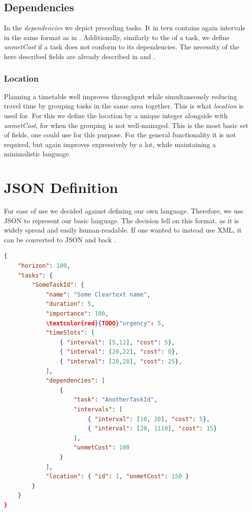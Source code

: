 \subsection*{Dependencies}
In the \textit{dependencies} we depict preceding tasks. It in tern contains again intervals in the same format as in . Additionally, similarly to the  of a task, we define \textit{unmetCost} if a task does not conform to its dependencies. The necessity of the here described fields are already described in  and .

\subsubsection*{Location}
Planning a timetable well improves throughput while simultaneously reducing travel time by grouping tasks in the same area together. This is what \textit{location} is used for. For this we define the location by a unique integer alongside with \textit{unmetCost}, for when the grouping is not well-managed. This is the most basic set of fields, one could use for this purpose. For the general functionality it is not required, but again improves expressively by a lot, while maintaining a minimalistic language.

\section{JSON Definition}
For ease of use we decided against defining our own language. Therefore, we use \ac{JSON} to represent our basic language. The decision fell on this format, as it is widely spread and easily human-readable. If one wanted to instead use XML, it can be converted to JSON and back \cite{bib:2017-LaFontaine}.
\begin{lstlisting}[language=json]
{
    "horizon": 100,
    "tasks": {
        "SomeTaskId": {
            "name": "Some Cleartext name",
            "duration": 5,
            "importance": 100,
            \textcolor{red}{TODO}"urgency": 5,
            "timeSlots": [
                { "interval": [5,12], "cost": 5},
                { "interval": [20,22], "cost": 0},
                { "interval": [20,28], "cost": 25},
            ],
            "dependencies": [
                { 
                    "task": "AnotherTaskId",
                    "intervals": [
                        { "interval": [10, 20], "cost": 5},
                        { "interval": [20, 1110], "cost": 15}
                    ],
                    "unmetCost": 100
                }
            ],
            "location": { "id": 1, "unmetCost": 150 }
        }
    }
}
\end{lstlisting}

